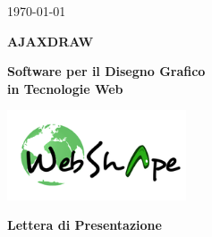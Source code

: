 \usepackage{multirow}


\renewcommand{\insertversion}{1.0} %
\renewcommand{\TITOLODOC}{Lettera di Presentazione} %

\begin{titlepage}
\begin{center}
	\begin{Large}	\today \end{Large}
\end{center}

\vspace{20pt}

\begin{center}
	\begin{Huge}
				\textbf{AJAXDRAW}
	\end{Huge}
\end{center}			

\begin{center}
	\begin{large}
				\textbf{Software per il Disegno Grafico\\ in Tecnologie Web}
	\end{large}
\end{center}			

\vspace{20pt}

\begin{center}
\includegraphics[width=150pt]{logo}
\end{center}

\vspace{160pt}
\begin{center} %
	\begin{Huge}
				\textbf{\TITOLODOC}
	\end{Huge}
			\\
\end{center}
\vspace{100pt}
\end{titlepage}

